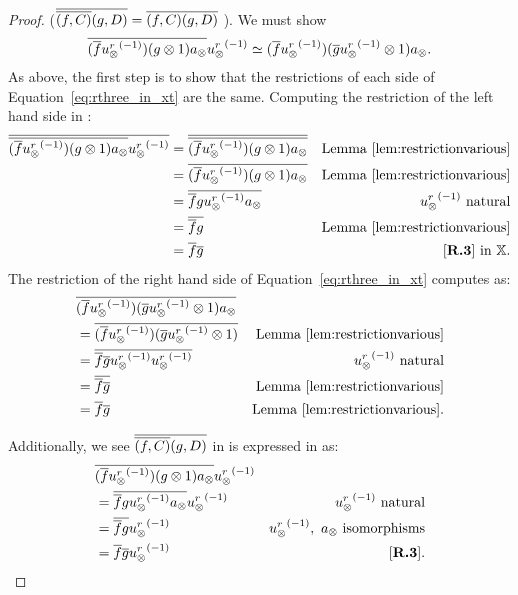 \begin{proof}
    \rthree ($\overline{\overline{(f,C)} (g,D)} = \overline{(f,C)} \overline{(g,D)}$ ). We must show
      \begin{equation}
        \overline{(\overline{f} {u_{\otimes}^r}^{(-1)}) (g\otimes 1) a_{\otimes}} {u_{\otimes}^r}^{(-1)} \overset{\scriptscriptstyle }{\simeq}
        (\overline{f} {u_{\otimes}^r}^{(-1)})(\overline{g} {u_{\otimes}^r}^{(-1)}\otimes 1) a_{\otimes}.
        \label{eq:rthree_in_xt}
      \end{equation}
      As above, the first step is
      to show that the restrictions of each side of Equation~\ref{eq:rthree_in_xt} are the same.
      Computing the restriction of the left
      hand side in \X:
      \begin{align*}
        \rst{\restr{(\restr{f} \inv{\usr}) (g\* 1) a_{\*}} \inv{\usr}}
        & = \rst{\restr{(\restr{f} \inv{\usr}) (g\* 1) a_{\*}}} & \text{Lemma \ref{lem:restrictionvarious}}\\
        & = \restr{(\restr{f} \inv{\usr}) (g\* 1) a_{\*}} &
          \text{Lemma \ref{lem:restrictionvarious}}\\
        & = \restr{\restr{f} g \inv{\usr} a_{\*}} & \inv{\usr} \text{ natural}\\
        & = \restr{\restr{f} g } & \text{Lemma \ref{lem:restrictionvarious}}\\
        & = \restr{f} \rst{g} & \text{\rthree in }\X.
      \end{align*}
      The restriction of the right hand side of Equation~\ref{eq:rthree_in_xt} computes as:
      \begin{align*}
        &\overline{(\overline{f} {u_{\otimes}^r}^{(-1)})(\overline{g} {u_{\otimes}^r}^{(-1)}\otimes 1) a_{\otimes}}\\
        & = \overline{(\overline{f} {u_{\otimes}^r}^{(-1)}) (\overline{g} {u_{\otimes}^r}^{(-1)}\otimes 1) } &  \text{Lemma \ref{lem:restrictionvarious}}\\
        & = \overline{\overline{f}  \overline{g} {u_{\otimes}^r}^{(-1)}{u_{\otimes}^r}^{(-1)} } &  {u_{\otimes}^r}^{(-1)} \text{ natural}\\
        & = \overline{\overline{f}  \overline{g} } &\text{Lemma \ref{lem:restrictionvarious}}\\
        & = \overline{f} \overline{g} & \text{Lemma \ref{lem:restrictionvarious}}.
      \end{align*}

      Additionally, we see $\overline{\overline{(f,C)} (g,D)}$ in \Xt is expressed in \X as:
      \begin{align*}
        &\restr{(\restr{f} \inv{\usr})(g\* 1) a_{\*}} \inv{\usr} \\
        &= \restr{\restr{f} g \inv{\usr} a_{\*}} \inv{\usr} &\inv{\usr}\text{ natural}\\
        &= \restr{\restr{f} g } \inv{\usr} &\inv{\usr},\ a_{\*}\text{ isomorphisms}\\
        & = \rst{f} \rst{g} \inv{\usr} & \text{\rthree}.
      \end{align*}


\end{proof}
